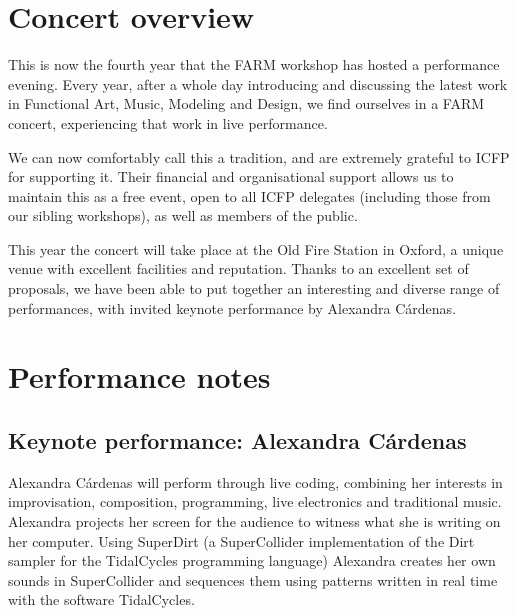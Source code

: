 \documentclass[sigplan,10pt]{acmart}\settopmatter{}
\begin{document}



\maketitle

\section{Concert overview}

This is now the fourth year that the FARM workshop has hosted a
performance evening. Every year, after a whole day introducing and
discussing the latest work in Functional Art, Music, Modeling and
Design, we find ourselves in a FARM concert, experiencing that work in
live performance. 

We can now comfortably call this a tradition, and are extremely
grateful to ICFP for supporting it. Their financial and organisational
support allows us to maintain this as a free event, open to all
ICFP delegates (including those from our sibling workshops), as well
as members of the public. 

This year the concert will take place at the Old Fire Station in
Oxford, a unique venue with excellent facilities and
reputation. Thanks to an excellent set of proposals, we have been able
to put together an interesting and diverse range of performances, with
invited keynote performance by Alexandra C\'{a}rdenas.

\section{Performance notes}

\subsection{Keynote performance: Alexandra C\'ardenas}

Alexandra C\'{a}rdenas will perform through live coding, combining her
interests in improvisation, composition, programming, live electronics
and traditional music. Alexandra projects her screen for the audience
to witness what she is writing on her computer. Using SuperDirt (a
SuperCollider implementation of the Dirt sampler for the TidalCycles
programming language) Alexandra creates her own sounds in
SuperCollider and sequences them using patterns written in real time
with the software TidalCycles.
\end{document}
